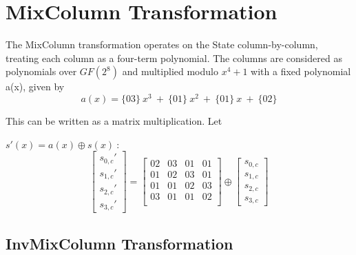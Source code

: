 \documentclass[10pt, conference, compsocconf]{IEEEtran}
\begin{document}
\section{MixColumn Transformation\cite{1512188}}
\label{sec:mix}

The MixColumn transformation operates on the State column-by-column, treating each column as a four-term polynomial. The columns are considered as polynomials over $GF(2^8)$ and multiplied modulo $x^4 + 1$ with a fixed polynomial a(x), given by 
\begin{equation}
a(x) = \{03\}~x^3 ~+ ~\{01\}~x^2 ~+ ~\{01\}~x ~+ ~\{02\}
\label{eq:sub5}
\end{equation}

This can be written as a matrix multiplication. Let 

$s'(x) = a (x) \oplus s(x)~ :$ 
\begin{equation}
\left[ \begin{array}{c}
s_{0,c}' \\s_{1,c}' \\s_{2,c}' \\s_{3,c}' \end{array} \right] =
\left[ \begin{array}{cccccccc}
02 & 03 & 01 & 01\\
01 & 02 & 03 & 01\\
01 & 01 & 02 & 03\\
03 & 01 & 01 & 02\\
 \end{array} \right] \oplus
 \left[ \begin{array}{c}
s_{0,c}\\s_{1,c}\\s_{2,c}\\s_{3,c} \end{array} \right]
\label{eq:sub6}
\end{equation}

\subsection {InvMixColumn Transformation}
\label{sec:invmix}
\end{document}
